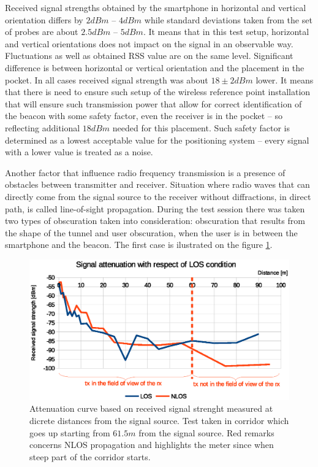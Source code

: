 \documentclass[../main.tex]{subfiles}
\begin{document}
Received signal strengths obtained by the smartphone in horizontal and vertical orientation differs by $2 dBm$ -- $4 dBm$ while standard deviations taken from the set of probes are about $2.5 dBm$ -- $5 dBm$. It means that in this test setup, horizontal and vertical orientations does not impact on the signal in an observable way. Fluctuations as well as obtained RSS value are on the same level. Significant difference is between horizontal or vertical orientation and the placement in the pocket. In all cases received signal strength was about $18\pm2 dBm$ lower. It means that there is need to ensure such setup of the wireless reference point installation that will ensure such transmission power that allow for correct identification of the beacon with some safety factor, even the receiver is in the pocket -- so reflecting additional $18dBm$ needed for this placement. Such safety factor is determined as a lowest acceptable value for the positioning system -- every signal with a lower value is treated as a noise.

Another factor that influence radio frequency transmission is a presence of obstacles between transmitter and receiver. Situation where radio waves that can directly come from the signal source to the receiver without diffractions, in direct path, is called line-of-sight propagation. During the test session there was taken two types of obscuration taken into consideration: obscuration that results from the shape of the tunnel and user obscuration, when the user is in between the smartphone and the beacon. The first case is ilustrated on the figure \ref{fig:tests_case4_los}.

\begin{figure}[!htbp]
\includegraphics[width=\textwidth, keepaspectratio]{pictures/tests_case4_los}
\centering
\caption{Attenuation curve based on received signal strenght measured at dicrete distances from the signal source. Test taken in corridor which goes up starting from $61.5 m$ from the signal source. Red remarks concerns NLOS propagation and highlights the meter since when steep part of the corridor starts.}
\label{fig:tests_case4_los}
\end{figure}
\end{document}

